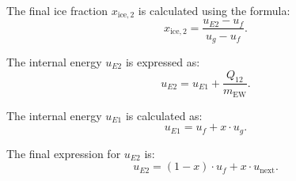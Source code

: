 The final ice fraction \( x_{\text{ice},2} \) is calculated using the formula:  
\[
x_{\text{ice},2} = \frac{u_{E2} - u_f}{u_g - u_f}.
\]  

The internal energy \( u_{E2} \) is expressed as:  
\[
u_{E2} = u_{E1} + \frac{Q_{12}}{m_{\text{EW}}}.
\]  

The internal energy \( u_{E1} \) is calculated as:  
\[
u_{E1} = u_f + x \cdot u_g.
\]  

The final expression for \( u_{E2} \) is:  
\[
u_{E2} = (1 - x) \cdot u_f + x \cdot u_{\text{next}}.
\]
